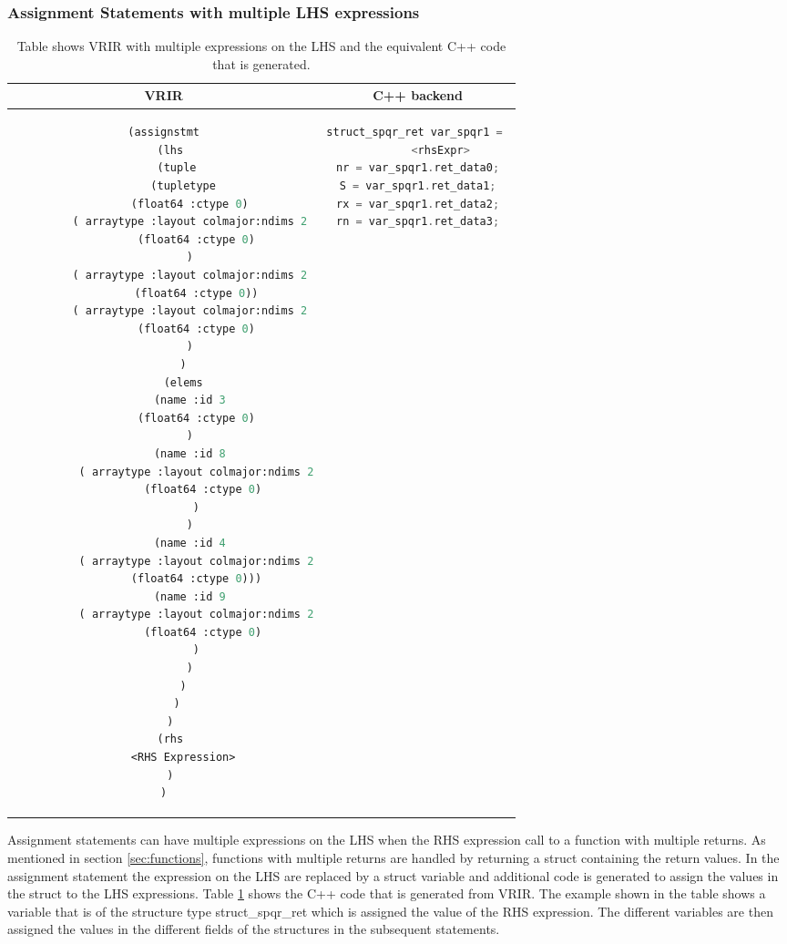 \subsubsection{Assignment Statements with multiple LHS expressions}
\begin{table}[htbp]
\begin{tabular}{|c|c|}
\hline 
VRIR & C++ backend \\
\hline 
{
\begin{lstlisting}[language=lisp, frame=none, numbers=none]
(assignstmt
  (lhs
    (tuple
      (tupletype
        (float64 :ctype 0)
        ( arraytype :layout colmajor:ndims 2
          (float64 :ctype 0)
        )
        ( arraytype :layout colmajor:ndims 2
          (float64 :ctype 0))
        ( arraytype :layout colmajor:ndims 2
          (float64 :ctype 0)
        )
      )
      (elems
        (name :id 3
          (float64 :ctype 0)
        )
        (name :id 8
          ( arraytype :layout colmajor:ndims 2
            (float64 :ctype 0)
          )
        )
        (name :id 4
          ( arraytype :layout colmajor:ndims 2
            (float64 :ctype 0)))  
        (name :id 9
          ( arraytype :layout colmajor:ndims 2
            (float64 :ctype 0)
          )
        )
      )
    )
  )
  (rhs
      <RHS Expression>
  )
)
\end{lstlisting}
} & 
{
\begin{lstlisting}[language=c,frame=none, numbers=none]
struct_spqr_ret var_spqr1 = 
		<rhsExpr> 
nr = var_spqr1.ret_data0;
S = var_spqr1.ret_data1;
rx = var_spqr1.ret_data2;
rn = var_spqr1.ret_data3;
\end{lstlisting}
} \\
\hline
\end{tabular}
\caption[Assignment with multiple LHS expressions]{Table shows VRIR with multiple expressions on the LHS and the equivalent C++ code that is generated.}
\label{tab:multAssignment}
\end{table}
Assignment statements can have multiple expressions on the LHS when the RHS expression call to a function  with multiple returns. As mentioned in section \ref{sec:functions}, functions with multiple returns are handled by returning a struct containing the return values. In the assignment statement the expression on the LHS are replaced by a struct variable and additional code is generated to assign the values in the struct to the LHS expressions. Table \ref{tab:multAssignment} shows the C++ code that is generated from VRIR. The example shown in the table shows a variable that is of the structure type struct\_spqr\_ret which is assigned the value of the RHS expression. The different variables are then assigned the values in the different fields of the structures in the subsequent statements.
